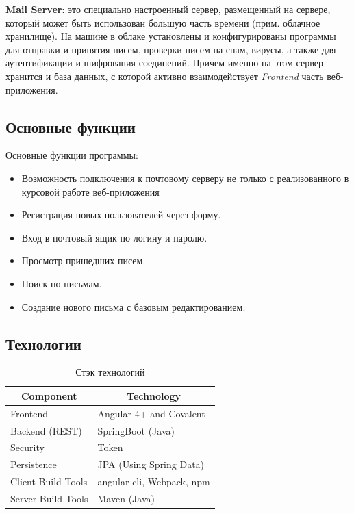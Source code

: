 \documentclass{article}
\begin{document}
\textbf{Mail Server}: это специально настроенный сервер, размещенный на сервере, который может быть использован большую часть времени (прим. облачное хранилище). На машине в облаке установлены и конфигурированы программы для отправки и принятия писем, проверки писем на спам, вирусы, а также для аутентификации и шифрования соединений. Причем именно на этом сервер хранится и база данных, с которой активно взаимодействует \emph{Frontend} часть веб-приложения. \\

\subsection{Основные функции}

Основные функции программы:

\begin{itemize}
  \item Возможность подключения к почтовому серверу не только с реализованного в курсовой работе веб-приложения
  \item Регистрация новых пользователей через форму.
  \item Вход в почтовый ящик по логину и паролю.
  \item Просмотр пришедших писем.
  \item Поиск по письмам.
  \item Создание нового письма с базовым редактированием.
\end{itemize}

\subsection{Технологии}

\begin{table}[]
\centering
\begin{tabular}{|l|l|}
\hline
\multicolumn{1}{|c|}{\textbf{Component}} & \multicolumn{1}{c|}{\textbf{Technology}} \\ \hline
Frontend                                 & Angular 4+ and Covalent                  \\
Backend (REST)                           & SpringBoot (Java)                        \\
Security                                 & Token                                    \\
Persistence                              & JPA (Using Spring Data)                  \\
Client Build Tools                       & angular-cli, Webpack, npm                \\
Server Build Tools                       & Maven (Java)                             \\ \hline
\end{tabular}
\caption{Стэк технологий}
\label{my-label}
\end{table}
\end{document}
